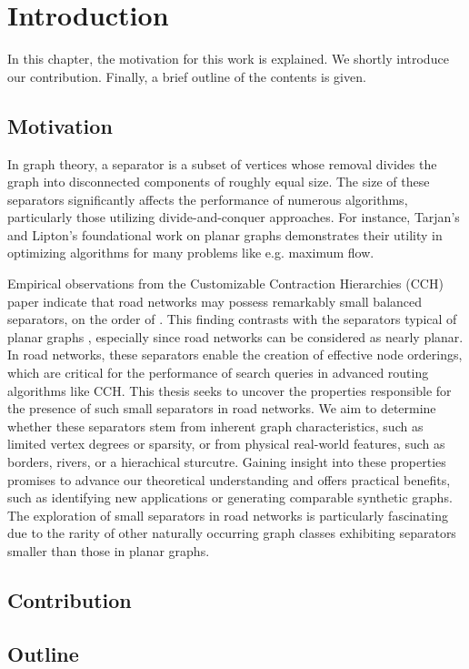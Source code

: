 \chapter{Introduction}
\label{ch:introduction}

In this chapter, the motivation for this work is explained. 
We shortly introduce our contribution.
Finally, a brief outline of the contents is given.

\section{Motivation}
\label{sec:motivation}

In graph theory, a separator is a subset of vertices whose removal divides the graph into disconnected components of roughly equal size.
The size of these separators significantly affects the performance of numerous algorithms, particularly those utilizing divide-and-conquer approaches.
For instance, Tarjan's and Lipton's foundational work on planar graphs \cite{lipton_applications_1977} demonstrates their utility in optimizing algorithms for many problems like e.g. maximum flow.

Empirical observations from the Customizable Contraction Hierarchies (CCH) paper indicate that road networks may possess remarkably small balanced separators, on the order of  \cite{dibbelt_customizable_2016}.
This finding contrasts with the  separators typical of planar graphs \cite{lipton_separator_1979}, especially since road networks can be considered as nearly planar.
In road networks, these separators enable the creation of effective node orderings, which are critical for the performance of search queries in advanced routing algorithms like CCH.
This thesis seeks to uncover the properties responsible for the presence of such small separators in road networks.
We aim to determine whether these separators stem from inherent graph characteristics, such as limited vertex degrees or sparsity, or from physical real-world features, such as borders, rivers, or a hierachical sturcutre.
Gaining insight into these properties promises to advance our theoretical understanding and offers practical benefits, such as identifying new applications or generating comparable synthetic graphs.
The exploration of small separators in road networks is particularly fascinating due to the rarity of other naturally occurring graph classes exhibiting separators smaller than those in planar graphs.

\section{Contribution}
\label{sec:Contribution}


\section{Outline}
\label{sec:overview}

